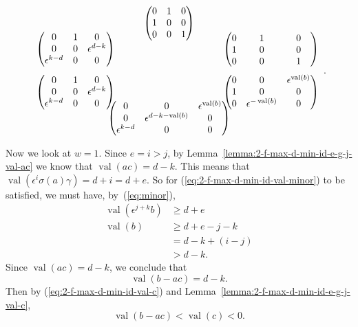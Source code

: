 \documentclass{amsart}
\theoremstyle{definition}
\def\e{\epsilon}
\def\val{\mathop{\mathrm{val}}}
\def\s{\sigma}
\def\heximages#1#2#3#4#5#6{
  \heximagessqueezedcarefully{1.7em}{-1em}{#1}{#2}{#3}{#4}{#5}{#6}
}
\def\heximagessqueezedcarefully#1#2#3#4#5#6#7#8{
  \begin{array}{ccc}
    & #3 & \\[#2]
    #5 \hspace{-#1} & & \hspace{-#1} #4 \\[2em]
    #6 \hspace{-#1} & & \hspace{-#1} #7 \\[#2]
    & #8 &
  \end{array}
}
\begin{document}
  \begin{equation}
    \label{eq:2-f-max-d-min-s1-hex2}
    \heximages
       {\begin{pmatrix}
           0 & 1 & 0 \\
           1 & 0 & 0 \\
           0 & 0 & 1
       \end{pmatrix}}
       {\begin{pmatrix}
	   & \hphantom{\e^{-\val(b)}} & \hphantom{\e^{\val(b)}} \\[-1em]
	   0 & 1 & 0 \\ 
           1 & 0 & 0 \\
           0 & 0 & 1 
       \end{pmatrix}}
       {\begin{pmatrix}
           0 & 1 & 0 \\
           0 & 0 & \e^{d-k} \\
           \e^{k-d} & 0 & 0
       \end{pmatrix}}
       {\begin{pmatrix}
           0 & 1 & 0 \\
           0 & 0 & \e^{d-k} \\
           \e^{k-d} & 0 & 0
       \end{pmatrix}}
       {\begin{pmatrix}
           0 & 0 & \e^{\val(b)} \\
           1 & 0 & 0 \\
           0 & \e^{-\val(b)}  & 0
       \end{pmatrix}}
       {\begin{pmatrix}
           0 & 0 & \e^{\val(b)} \\
           0 & \e^{d - k - \val(b)} & 0 \\
           \e^{k-d} & 0  & 0
       \end{pmatrix}}.
  \end{equation}

  Now we look at $w = 1$.  Since $e = i > j$, by
  Lemma~\ref{lemma:2-f-max-d-min-id-e-g-j-val-ac} we know that $\val(ac) = d -
  k$.  This means that $\val(\e^i\s(a)\gamma) = d + i = d + e$.  So for
  (\ref{eq:2-f-max-d-min-id-val-minor}) to be satisfied, we must have,
  by~(\ref{eq:minor}),
  \begin{align*}
    \val(\e^{j+k}b) &\ge d + e \\
    \val(b) &\ge d + e - j - k \\
            &= d  -k + (i - j) \\
            &> d-k.
  \end{align*}
  Since $\val(ac) = d -k$, we conclude that
  \begin{equation}
    \label{eq:2-f-max-d-min-id-e-eq-i-val-b-minus-ac}
    \val(b-ac) = d - k.
  \end{equation}
  Then by (\ref{eq:2-f-max-d-min-id-val-c}) and
  Lemma~\ref{lemma:2-f-max-d-min-id-e-g-j-val-c},
  \begin{equation}
    \label{eq:2-f-max-d-min-id-e-eq-i-val-b-minus-ac2}
    \val(b-ac) < \val(c) < 0.
  \end{equation}
\end{document}
